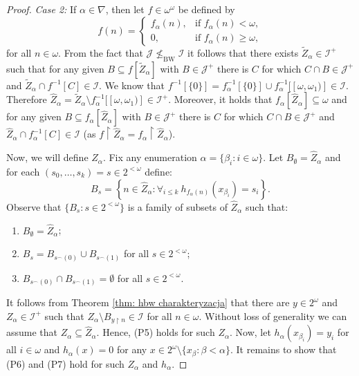 \documentclass{amsart}
\theoremstyle{plain}
\theoremstyle{definition}
\theoremstyle{remark}
\newcommand{\cI}{\mathcal{I}}
\newcommand{\I}{\cI}
\newcommand{\cJ}{\mathcal{J}}
\newcommand{\J}{\cJ}
\newcommand{\BW}{\mathrm{BW}}
\begin{document}
\begin{proof}
\textit{Case 2:} If $\alpha \in \nabla$, then let $f \in \omega^\omega$ be defined by $$f(n)=\begin{cases}
    f_\alpha(n),  & \text{if } f_\alpha(n)<\omega, \\ 0, & \text{if } f_\alpha(n) \geq\omega \textrm{,}
\end{cases}$$
for all $n \in \omega$. From the fact that $\J \nleq_\BW\I$ it follows that there exists $\widetilde{Z}_\alpha\in \I^+$ such that for any given $B \subseteq f[\widetilde{Z}_\alpha]$ with $B \in \J^+$ there is $C$ for which $C\cap B\in\J^+$ and $\widetilde{Z}_\alpha \cap f^{-1}[C]\in\I$. We know that $f^{-1}[\{0\}]=f_\alpha^{-1}[\{0\}] \cup f_\alpha^{-1}[[\omega,\omega_1)]\in \I$. Therefore $\widehat{Z}_\alpha=\widetilde{Z}_\alpha\setminus f_\alpha^{-1}[[\omega,\omega_1)] \in \I^+$. Moreover, it holds that $f_\alpha[\widehat{Z}_\alpha]\subseteq\omega$ and for any given $B \subseteq f_\alpha[\widehat{Z}_\alpha]$ with $B \in \J^+$ there is $C$ for which $C\cap B\in\J^+$ and $\widehat{Z}_\alpha \cap f_\alpha^{-1}[C]\in\I$ (as $f\upharpoonright\widehat{Z}_\alpha=f_\alpha\upharpoonright\widehat{Z}_\alpha$).

\medskip

Now, we will define $Z_\alpha$. Fix any enumeration $\alpha=\{\beta_i:i \in \omega\}$. Let $B_\emptyset=\widehat{Z}_\alpha$ and for each $(s_0,\ldots,s_k)=s\in 2^{<\omega}$ define: 
$$B_s=\left\{n \in \widehat{Z}_\alpha: \forall_{i\leq k}\ h_{f_\alpha(n)}(x_{\beta_i})=s_i\right\} \textrm{.}$$ 
Observe that $\{B_s:s \in 2^{<\omega}\}$ is a family of subsets of $\widehat{Z}_\alpha$ such that:
\begin{enumerate}
\item $B_{\emptyset}=\widehat{Z}_\alpha$;
\item $B_s=B_{s^{\frown} (0)} \cup B_{s^{\frown} (1)}$ for all $s\in 2^{<\omega}$;
\item $B_{s^{\frown}  (0)} \cap B_{s^{\frown} (1)}=\emptyset$ for all $s\in 2^{<\omega}$.
\end{enumerate}
It follows from Theorem \ref{thm: hbw charakteryzacja} that there are $y \in 2^\omega$ and $Z_\alpha \in \I^+$ such that $Z_\alpha \setminus B_{y \upharpoonright n} \in \I$ for all $n\in\omega$. Without loss of generality we can assume that $Z_\alpha \subseteq \widehat{Z}_\alpha$. Hence, (P5) holds for such $Z_\alpha$. Now, let $h_\alpha(x_{\beta_i})=y_i$ for all $i \in \omega$ and $h_\alpha(x)=0$ for any $x\in 2^\omega\setminus\{x_\beta:\beta<\alpha\}$. It remains to show that (P6) and (P7) hold for such $Z_\alpha$ and $h_\alpha$.


\end{proof}
\end{document}
